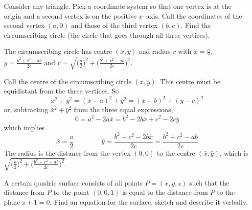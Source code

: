 \begin{question}
Consider any triangle. Pick a coordinate system so that one vertex
is at the origin and a second vertex is on the positive $x$--axis. Call
the coordinates of the second vertex $(a,0)$ and those of the third vertex
$(b,c)$. Find the circumscribing circle (the circle that goes through all
three vertices).
\end{question}

%


\begin{answer}
The circumscribing circle has centre $(\bar x,\bar y)$ and radius $r$
with $\bar x=\frac{a}{2}$, $\bar y=\frac{b^2+c^2-ab}{2c}$ and
$r=\sqrt{\big(\frac{a}{2}\big)^2+\big(\frac{b^2+c^2-ab}{2c}\big)^2}$.
\end{answer}


\begin{solution}
Call the centre of the circumscribing circle 
$(\bar x,\bar y)$. This centre must be equidistant from the three vertices.
So
\begin{equation*}
\bar x^2+\bar y^2=(\bar x-a)^2+\bar y^2=(\bar x-b)^2+(\bar y-c)^2 
\end{equation*}
or, subtracting $\bar x^2+\bar y^2$ from the three equal expressions,
\begin{equation*}
0=a^2-2a\bar x=b^2-2b\bar x+c^2-2c\bar y
\end{equation*}
which implies
\begin{equation*}
\bar x=\frac{a}{2}\qquad\qquad \bar y
=\frac{b^2+c^2-2b\bar x}{2c}=\frac{b^2+c^2-ab}{2c}
\end{equation*}
The radius is the distance from the vertex $(0,0)$ to the centre 
$(\bar x,\bar y)$, which is
$\sqrt{\big(\frac{a}{2}\big)^2+\big(\frac{b^2+c^2-ab}{2c}\big)^2}$.

\end{solution}

\begin{question} [M200 2001A] %
A certain quadric surface consists of all points $P=(x,y,z)$
such that the distance from $P$ to the point $(0,0,1)$ is equal to the
distance from $P$ to the plane $z+1=0$. Find an equation for the surface,
sketch and describe it verbally.
\end{question}

%

